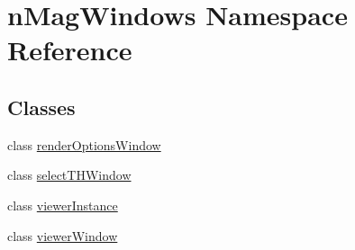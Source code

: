 \hypertarget{namespacenMagWindows}{}\section{n\+Mag\+Windows Namespace Reference}
\label{namespacenMagWindows}
\subsection*{Classes}
\begin{DoxyCompactItemize}
\item 
class \hyperlink{classnMagWindows_1_1renderOptionsWindow}{render\+Options\+Window}
\item 
class \hyperlink{classnMagWindows_1_1selectTHWindow}{select\+T\+H\+Window}
\item 
class \hyperlink{classnMagWindows_1_1viewerInstance}{viewer\+Instance}
\item 
class \hyperlink{classnMagWindows_1_1viewerWindow}{viewer\+Window}
\end{DoxyCompactItemize}
